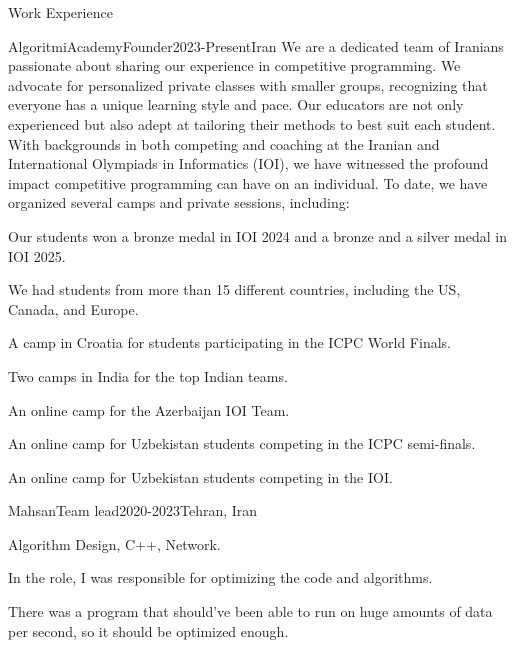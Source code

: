 
\begin{section}{Work Experience}{
    \begin{subsection}{AlgoritmiAcademy}{Founder}{2023-Present}{Iran}
    We are a dedicated team of Iranians passionate about sharing our experience in competitive programming. We advocate for personalized private classes with smaller groups, recognizing that everyone has a unique learning style and pace. Our educators are not only experienced but also adept at tailoring their methods to best suit each student. With backgrounds in both competing and coaching at the Iranian and International Olympiads in Informatics (IOI), we have witnessed the profound impact competitive programming can have on an individual.
To date, we have organized several camps and private sessions, including:
\item Our students won a bronze medal in IOI 2024 and a bronze and a silver medal in IOI 2025.
\item We had students from more than 15 different countries, including the US, Canada, and Europe. 
\item A camp in Croatia for students participating in the ICPC World Finals.
\item Two camps in India for the top Indian teams.
\item An online camp for the Azerbaijan IOI Team.
\item An online camp for Uzbekistan students competing in the ICPC semi-finals.
\item An online camp for Uzbekistan students competing in the IOI.
    \end{subsection}
    
    \begin{subsection}{Mahsan}{Team lead}{2020-2023}{Tehran, Iran}
    \item Algorithm Design, C++, Network.
    \item In the role, I was responsible for optimizing the code and algorithms. 
    \item There was a program that should've been able to run on huge amounts of data per second, so it should be optimized enough.
    \end{subsection}
    
}
\end{section}
